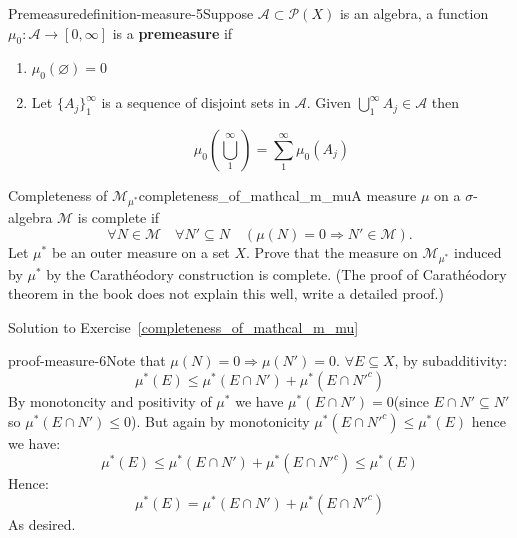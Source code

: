 \begin{mystthmdefinition}{Premeasure}{definition-measure-5}Suppose $\mathcal A\subset \mathcal P(X)$ is an algebra, a function $\mu_0 : \mathcal A\to [0,\infty]$ is a \textbf{premeasure} if

\begin{enumerate}
\item $\mu_0(\varnothing)=0$
\item Let $\{A_j\}_1^{\infty}$ is a sequence of disjoint sets in $\mathcal A$. Given $\bigcup_1^{\infty} A_j \in \mathcal A$ then

\begin{equation}
\mu_0 \left( \bigcup_1^{\infty}\right) = \sum_{1}^{\infty} \mu_0(A_j)
\end{equation}
\end{enumerate}

\end{mystthmdefinition}
\begin{mystexercise}{Completeness of $\mathcal M_{\mu^*}$}{completeness_of_mathcal_m_mu}\label{completeness_of_mathcal_m_mu}A measure $\mu$ on a $\sigma$-algebra $\mathcal{M}$ is complete if
\begin{equation}
\forall N \in \mathcal{M} \quad \forall N' \subseteq N \quad (\mu(N) = 0 \Rightarrow N' \in \mathcal{M}).
\end{equation}
Let $\mu^*$ be an outer measure on a set $X$. Prove that the measure on $\mathcal{M}_{\mu^*}$ induced by $\mu^*$ by the Carathéodory construction is complete. (The proof of Carathéodory theorem in the book does not explain this well, write a detailed proof.)

\end{mystexercise}
\begin{mystsolution}{Solution to Exercise~\ref{completeness_of_mathcal_m_mu}}\begin{mystthmproof}{}{proof-measure-6}Note that $\mu(N)=0\Longrightarrow \mu(N')=0$. $\forall E\subseteq X$, by subadditivity:
\begin{equation}
\mu^*(E) \leq \mu^*(E\cap N') + \mu^*(E\cap N'^c)
\end{equation}
By monotoncity and positivity of $\mu^*$ we have $\mu^*(E\cap N')=0$(since $E\cap N' \subseteq N'$ so $\mu^*(E\cap N')\leq 0$). But again by monotonicity $\mu^*(E\cap N'^c) \leq \mu^*(E)$ hence we have:
\begin{equation}
\mu^*(E) \leq \mu^*(E\cap N') + \mu^*(E\cap N'^c) \leq \mu^*(E)
\end{equation}
Hence:
\begin{equation}
\mu^*(E) = \mu^*(E\cap N') + \mu^*(E\cap N'^c)
\end{equation}
As desired.

\end{mystthmproof}
\end{mystsolution}
